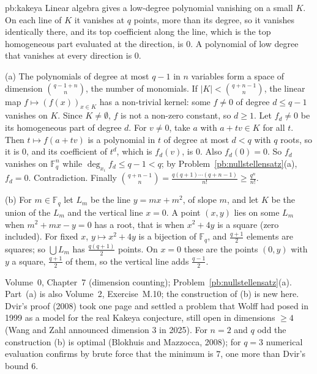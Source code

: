 \begin{solution}{pb:kakeya}
\idea Linear algebra gives a low-degree polynomial vanishing on a small $K$. On each line of $K$ it vanishes at $q$ points, more
than its degree, so it vanishes identically there, and its top coefficient along the line, which is the top homogeneous part
evaluated at the direction, is $0$. A polynomial of low degree that vanishes at every direction is $0$.

\writeup (a) The polynomials of degree at most $q-1$ in $n$ variables form a space of dimension $\binom{q-1+n}n$, the number of
monomials. If $|K|<\binom{q+n-1}n$, the linear map $f\mapsto(f(x))_{x\in K}$ has a non-trivial kernel: some $f\ne0$ of degree
$d\le q-1$ vanishes on $K$. Since $K\ne\emptyset$, $f$ is not a non-zero constant, so $d\ge1$. Let $f_d\ne0$ be its homogeneous part of
degree $d$. For $v\ne0$, take $a$ with $a+tv\in K$ for all $t$. Then $t\mapsto f(a+tv)$ is a polynomial in $t$ of degree at most $d<q$
with $q$ roots, so it is $0$, and its coefficient of $t^d$, which is $f_d(v)$, is $0$. Also $f_d(0)=0$. So $f_d$ vanishes on
$\mathbb F_q^n$ while $\deg_{x_i}f_d\le q-1<q$; by Problem~\ref{pb:nullstellensatz}(a), $f_d=0$. Contradiction. Finally
$\binom{q+n-1}n=\frac{q(q+1)\cdots(q+n-1)}{n!}\ge\frac{q^n}{n!}$.

(b) For $m\in\mathbb F_q$ let $L_m$ be the line $y=mx+m^2$, of slope $m$, and let $K$ be the union of the $L_m$ and the vertical line
$x=0$. A point $(x,y)$ lies on some $L_m$ when $m^2+mx-y=0$ has a root, that is when $x^2+4y$ is a square (zero included). For fixed
$x$, $y\mapsto x^2+4y$ is a bijection of $\mathbb F_q$, and $\frac{q+1}2$ elements are squares; so $\bigcup L_m$ has $\frac{q(q+1)}2$
points. On $x=0$ these are the points $(0,y)$ with $y$ a square, $\frac{q+1}2$ of them, so the vertical line adds $\frac{q-1}2$.

\tools Volume~0, Chapter~7 (dimension counting); Problem~\ref{pb:nullstellensatz}(a). Part~(a) is also Volume~2, Exercise~M.10; the construction of (b) is new here.
\leads Dvir's proof (2008) took one page and settled a problem that Wolff had posed in 1999 as a model for the real Kakeya
conjecture, still open in dimensions $\ge4$ (Wang and Zahl announced dimension $3$ in 2025). For $n=2$ and $q$ odd the
construction (b) is optimal (Blokhuis and Mazzocca, 2008); for $q=3$ numerical evaluation confirms by brute force that the minimum is $7$,
one more than Dvir's bound $6$.
\end{solution}

